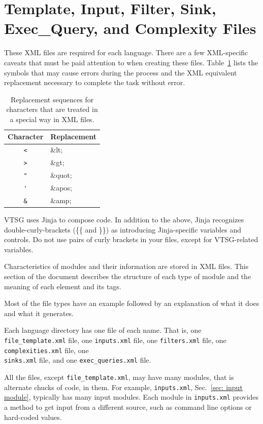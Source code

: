 \documentclass[12pt]{article}
\begin{document}
\section{Template, Input, Filter, Sink, Exec\_Query, and Complexity Files}
\label{sec:source files}

These XML files are required for each language.
There 
are a few XML-specific caveats that must be paid attention to when 
creating these files. 
Table~\ref{tab:XML escapes} lists the symbols that may cause errors 
during the process and the XML equivalent replacement necessary to 
complete the
task without error.

\begin{table}[H]
\centering
\caption{Replacement sequences for characters that are treated 
in a special way in XML files.}
\begin{tabular}{|c|l|}
\hline
\textbf{Character} & \textbf{Replacement} \\
\hline
 \verb|<| & \&lt; \\
\hline
 \verb|>| & \&gt; \\
\hline
 \verb|"| & \&quot; \\
\hline
 \verb|'| & \&apos; \\
\hline
 \verb|&| & \&amp; \\
\hline
\end{tabular}
\label{tab:XML escapes}
\end{table}

VTSG uses Jinja to compose code. In addition to the above, Jinja recognizes
double-curly-brackets (\{\{ and \}\}) as introducing Jinja-specific variables and
controls.  Do not use pairs of curly brackets in your files, except for VTSG-related
variables.

Characteristics of modules and their information are stored in 
XML files.  
This section of the document describes the structure of each type of module and
the meaning
of each element and its tags.

Most of the file types have an example followed by
an explanation of what it does and what it generates.

Each language directory has one file of each name. That is,
one \verb|file_template.xml| file, one \verb|inputs.xml| file,
one \verb|filters.xml| file, one \verb|complexities.xml| file,
one \\ \verb|sinks.xml| file, and one \verb|exec_queries.xml| file.

All the files, except \verb|file_template.xml|, may have many
modules, that is alternate chucks of code, in them.
For example, \verb|inputs.xml|, Sec.~\ref{sec: input module}, typically has many input
modules.  Each module in \verb|inputs.xml| provides a method to get input from a
different source, such as command line options or hard-coded values.
\end{document}
